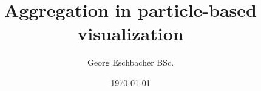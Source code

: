 \newcommand{\iauthor}{Georg Eschbacher BSc.}
\newcommand{\isupervisor}{Assist.-Prof. Dipl.-Ing. Dr.techn. Marc Streit}
\newcommand{\imatrikel}{1410695007}
\newcommand{\ititle}{Aggregation in particle-based visualization}
\newcommand{\ipapertype}{Masterarbeit}


\newcommand{\tattainment}{zur Erlangung des akademischen Grades}
\newcommand{\tdegree}{Master of Science}
\newcommand{\tauthor}{VerfasserIn}
\newcommand{\tsubmitted}{Vorgelegt am FH Masterstudiengang MultiMediaTechnology, Fachhochschule Salzburg}
\newcommand{\texamined}{Begutachtet durch}
\newcommand{\tsupervisor}{BetreuerIn}

\title{\ititle}
\author{\iauthor}


\date{\today}